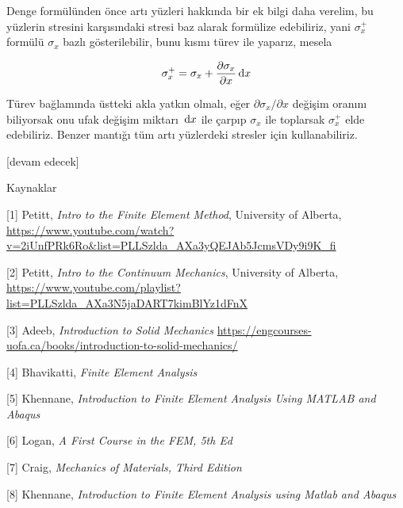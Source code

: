 \documentclass[12pt,fleqn]{article}\usepackage{../../common}
\begin{document}
Denge formülünden önce artı yüzleri hakkında bir ek bilgi daha verelim, bu
yüzlerin stresini karşısındaki stresi baz alarak formülize edebiliriz,
yani $\sigma_x^+$ formülü $\sigma_x$ bazlı gösterilebilir, bunu kısmı türev
ile yaparız, mesela

$$
\sigma_x^+ = \sigma_x + \frac{\partial \sigma_x}{\partial x} \,\mathrm{d} x
$$

Türev bağlamında üstteki akla yatkın olmalı, eğer $\partial \sigma_x / \partial x$
değişim oranını biliyorsak onu ufak değişim miktarı $\,\mathrm{d} x$ ile çarpıp
$\sigma_x$ ile toplarsak $\sigma_x^+$ elde edebiliriz. Benzer mantığı tüm artı
yüzlerdeki stresler için kullanabiliriz.


[devam edecek]

Kaynaklar

[1] Petitt, {\em Intro to the Finite Element Method}, University of Alberta,
    \url{https://www.youtube.com/watch?v=2iUnfPRk6Ro&list=PLLSzlda_AXa3yQEJAb5JcmsVDy9i9K_fi}

[2] Petitt, {\em Intro to the Continuum Mechanics}, University of Alberta,
    \url{https://www.youtube.com/playlist?list=PLLSzlda_AXa3N5jaDART7kimBlYz1dFnX}

[3] Adeeb, {\em Introduction to Solid Mechanics}
    \url{https://engcourses-uofa.ca/books/introduction-to-solid-mechanics/}

[4] Bhavikatti, {\em Finite Element Analysis}    
    
[5] Khennane, {\em Introduction to Finite Element Analysis Using MATLAB and Abaqus}

[6] Logan, {\em A First Course in the FEM, 5th Ed}

[7] Craig, {\em Mechanics of Materials, Third Edition}

[8] Khennane, {\em Introduction to Finite Element Analysis using Matlab and Abaqus}
\end{document}
